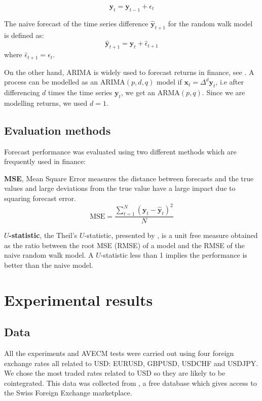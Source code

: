 \begin{equation}
\mathbf{y}_t = \mathbf{y}_{t-1} + \epsilon_{t}
\label{rwmodel}
\end{equation}

The naive forecast of the time series difference $\hat{\mathbf{y}}_{t+1}$ for
the random walk model is defined as:
\begin{equation}
\hat{\mathbf{y}}_{t+1} = \mathbf{y}_t + \hat{\epsilon}_{t+1} 
\end{equation}
\noindent where  $\hat{\epsilon}_{t+1} = \epsilon_{t}$.

On the other hand, ARIMA is widely used to forecast returns in finance, see
\cite{tsay2005}. A process can be modelled as an ARIMA$(p,d,q)$ model if
$\mathbf{x}_t=\Delta^d \mathbf{y}_t $, i.e after differencing $d$ times the time
series $\mathbf{y}_t$,  we get an ARMA$(p,q)$. Since we are modelling returns,
we used $d=1$.


\subsection{Evaluation methods} \label{sec:evaluation}

Forecast performance was evaluated using two different methods which are
frequently used in finance:
\begin{description}
\item
{\bf MSE},  Mean Square Error measures the distance between forecasts
and the true values and large deviations from the true value have a
large impact due to squaring forecast error.
\begin{equation}\label{eq:MSE}
\text{MSE} = 
\frac{\displaystyle \sum_{t=1}^{N} (\mathbf{y}_t-\hat{\mathbf{y}}_t)^2}{N}
\end{equation}
\item {\bf $U$-statistic}, the Theil's $U$-statistic, presented by
\cite{theil1966}, is a unit free measure obtained as the ratio between the root
MSE (RMSE) of a model and the RMSE of the naive random walk model. A
$U$-statistic less than 1 implies the performance is better than the naive
model.
\end{description}


\section{Experimental results}
\label{sec:results}
\subsection{Data} \label{sec:unitroot}
All the experiments and AVECM tests were carried out using four foreign exchange rates all related to
USD: EURUSD, GBPUSD, USDCHF and USDJPY. We chose the most traded rates related
to USD so they are likely to be cointegrated. 
This data was collected from
\cite{Dukascopy2014}, a free database which gives access to the Swiss Foreign
Exchange marketplace.

